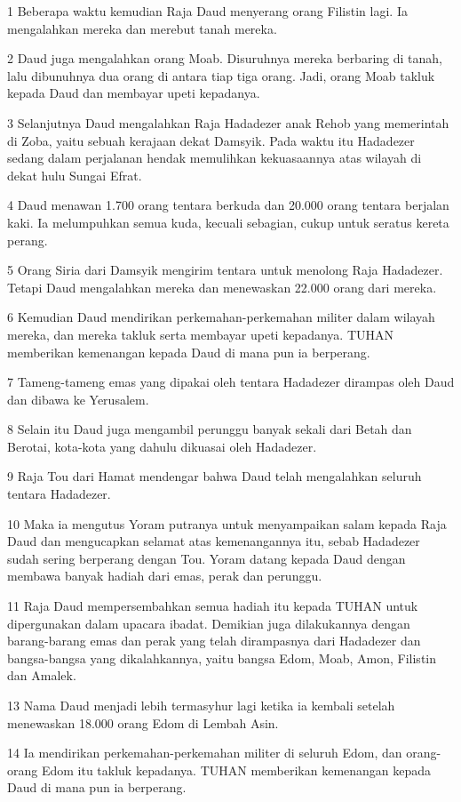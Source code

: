 \par 1 Beberapa waktu kemudian Raja Daud menyerang orang Filistin lagi. Ia mengalahkan mereka dan merebut tanah mereka.
\par 2 Daud juga mengalahkan orang Moab. Disuruhnya mereka berbaring di tanah, lalu dibunuhnya dua orang di antara tiap tiga orang. Jadi, orang Moab takluk kepada Daud dan membayar upeti kepadanya.
\par 3 Selanjutnya Daud mengalahkan Raja Hadadezer anak Rehob yang memerintah di Zoba, yaitu sebuah kerajaan dekat Damsyik. Pada waktu itu Hadadezer sedang dalam perjalanan hendak memulihkan kekuasaannya atas wilayah di dekat hulu Sungai Efrat.
\par 4 Daud menawan 1.700 orang tentara berkuda dan 20.000 orang tentara berjalan kaki. Ia melumpuhkan semua kuda, kecuali sebagian, cukup untuk seratus kereta perang.
\par 5 Orang Siria dari Damsyik mengirim tentara untuk menolong Raja Hadadezer. Tetapi Daud mengalahkan mereka dan menewaskan 22.000 orang dari mereka.
\par 6 Kemudian Daud mendirikan perkemahan-perkemahan militer dalam wilayah mereka, dan mereka takluk serta membayar upeti kepadanya. TUHAN memberikan kemenangan kepada Daud di mana pun ia berperang.
\par 7 Tameng-tameng emas yang dipakai oleh tentara Hadadezer dirampas oleh Daud dan dibawa ke Yerusalem.
\par 8 Selain itu Daud juga mengambil perunggu banyak sekali dari Betah dan Berotai, kota-kota yang dahulu dikuasai oleh Hadadezer.
\par 9 Raja Tou dari Hamat mendengar bahwa Daud telah mengalahkan seluruh tentara Hadadezer.
\par 10 Maka ia mengutus Yoram putranya untuk menyampaikan salam kepada Raja Daud dan mengucapkan selamat atas kemenangannya itu, sebab Hadadezer sudah sering berperang dengan Tou. Yoram datang kepada Daud dengan membawa banyak hadiah dari emas, perak dan perunggu.
\par 11 Raja Daud mempersembahkan semua hadiah itu kepada TUHAN untuk dipergunakan dalam upacara ibadat. Demikian juga dilakukannya dengan barang-barang emas dan perak yang telah dirampasnya dari Hadadezer dan bangsa-bangsa yang dikalahkannya, yaitu bangsa Edom, Moab, Amon, Filistin dan Amalek.
\par 13 Nama Daud menjadi lebih termasyhur lagi ketika ia kembali setelah menewaskan 18.000 orang Edom di Lembah Asin.
\par 14 Ia mendirikan perkemahan-perkemahan militer di seluruh Edom, dan orang-orang Edom itu takluk kepadanya. TUHAN memberikan kemenangan kepada Daud di mana pun ia berperang.
